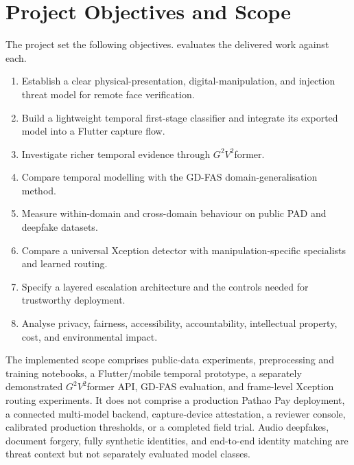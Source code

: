 \section{Project Objectives and Scope}

The project set the following objectives.  evaluates
the delivered work against each.

\begin{enumerate}
  \item[\textbf{O1.}] Establish a clear physical-presentation, digital-manipulation,
        and injection threat model for remote face verification.
  \item[\textbf{O2.}] Build a lightweight temporal first-stage classifier and
        integrate its exported model into a Flutter capture flow.
  \item[\textbf{O3.}] Investigate richer temporal evidence through
        $G^2V^2$former.
  \item[\textbf{O4.}] Compare temporal modelling with the GD-FAS
        domain-generalisation method.
  \item[\textbf{O5.}] Measure within-domain and cross-domain behaviour on public
        PAD and deepfake datasets.
  \item[\textbf{O6.}] Compare a universal Xception detector with
        manipulation-specific specialists and learned routing.
  \item[\textbf{O7.}] Specify a layered escalation architecture and the controls
        needed for trustworthy deployment.
  \item[\textbf{O8.}] Analyse privacy, fairness, accessibility, accountability,
        intellectual property, cost, and environmental impact.
\end{enumerate}

The implemented scope comprises public-data experiments, preprocessing and
training notebooks, a Flutter/mobile temporal prototype, a separately demonstrated
$G^2V^2$former API, GD-FAS evaluation, and frame-level Xception routing experiments.
It does not comprise a production Pathao Pay deployment, a connected multi-model
backend, capture-device attestation, a reviewer console, calibrated production
thresholds, or a completed field trial. Audio deepfakes, document forgery, fully
synthetic identities, and end-to-end identity matching are threat context but not
separately evaluated model classes.

